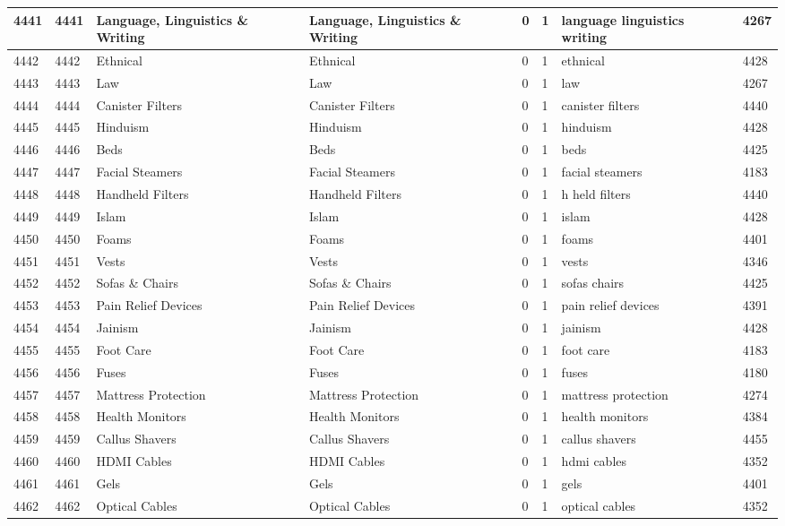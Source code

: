 \begin{longtable}{|l|l|l|l|l|l|l|l|}
4441 & 4441 & Language, Linguistics \& Writing & Language, Linguistics \& Writing & 0 & 1 & language linguistics writing & 4267 \\ \hline 
4442 & 4442 & Ethnical & Ethnical & 0 & 1 & ethnical & 4428 \\ \hline 
4443 & 4443 & Law & Law & 0 & 1 & law & 4267 \\ \hline 
4444 & 4444 & Canister Filters & Canister Filters & 0 & 1 & canister filters & 4440 \\ \hline 
4445 & 4445 & Hinduism & Hinduism & 0 & 1 & hinduism & 4428 \\ \hline 
4446 & 4446 & Beds & Beds & 0 & 1 & beds & 4425 \\ \hline 
4447 & 4447 & Facial Steamers & Facial Steamers & 0 & 1 & facial steamers & 4183 \\ \hline 
4448 & 4448 & Handheld Filters & Handheld Filters & 0 & 1 & h held filters & 4440 \\ \hline 
4449 & 4449 & Islam & Islam & 0 & 1 & islam & 4428 \\ \hline 
4450 & 4450 & Foams & Foams & 0 & 1 & foams & 4401 \\ \hline 
4451 & 4451 & Vests & Vests & 0 & 1 & vests & 4346 \\ \hline 
4452 & 4452 & Sofas \& Chairs & Sofas \& Chairs & 0 & 1 & sofas chairs & 4425 \\ \hline 
4453 & 4453 & Pain Relief Devices & Pain Relief Devices & 0 & 1 & pain relief devices & 4391 \\ \hline 
4454 & 4454 & Jainism & Jainism & 0 & 1 & jainism & 4428 \\ \hline 
4455 & 4455 & Foot Care & Foot Care & 0 & 1 & foot care & 4183 \\ \hline 
4456 & 4456 & Fuses & Fuses & 0 & 1 & fuses & 4180 \\ \hline 
4457 & 4457 & Mattress Protection & Mattress Protection & 0 & 1 & mattress protection & 4274 \\ \hline 
4458 & 4458 & Health Monitors & Health Monitors & 0 & 1 & health monitors & 4384 \\ \hline 
4459 & 4459 & Callus Shavers & Callus Shavers & 0 & 1 & callus shavers & 4455 \\ \hline 
4460 & 4460 & HDMI Cables & HDMI Cables & 0 & 1 & hdmi cables & 4352 \\ \hline 
4461 & 4461 & Gels & Gels & 0 & 1 & gels & 4401 \\ \hline 
4462 & 4462 & Optical Cables & Optical Cables & 0 & 1 & optical cables & 4352 \\ \hline 

\end{longtable}
